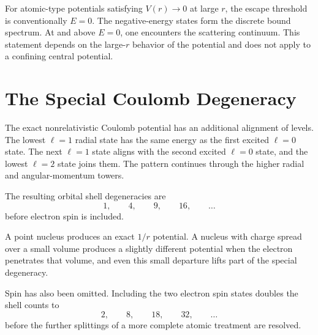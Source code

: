 For atomic-type potentials satisfying \(V(r)\to0\) at large \(r\), the escape threshold is conventionally \(E=0\). The negative-energy states form the discrete bound spectrum. At and above \(E=0\), one encounters the scattering continuum. This statement depends on the large-\(r\) behavior of the potential and does not apply to a confining central potential.

\section{The Special Coulomb Degeneracy}

The exact nonrelativistic Coulomb potential has an additional alignment of levels. The lowest \(\ell=1\) radial state has the same energy as the first excited \(\ell=0\) state. The next \(\ell=1\) state aligns with the second excited \(\ell=0\) state, and the lowest \(\ell=2\) state joins them. The pattern continues through the higher radial and angular-momentum towers.

\begin{classroomqa}
\end{classroomqa}

The resulting orbital shell degeneracies are
\begin{equation}
1,\qquad 4,\qquad 9,\qquad 16,\qquad \ldots
\end{equation}
before electron spin is included.

\begin{classroomqa}
\end{classroomqa}

A point nucleus produces an exact \(1/r\) potential. A nucleus with charge spread over a small volume produces a slightly different potential when the electron penetrates that volume, and even this small departure lifts part of the special degeneracy.

Spin has also been omitted. Including the two electron spin states doubles the shell counts to
\begin{equation}
2,\qquad 8,\qquad 18,\qquad 32,\qquad \ldots
\end{equation}
before the further splittings of a more complete atomic treatment are resolved.

